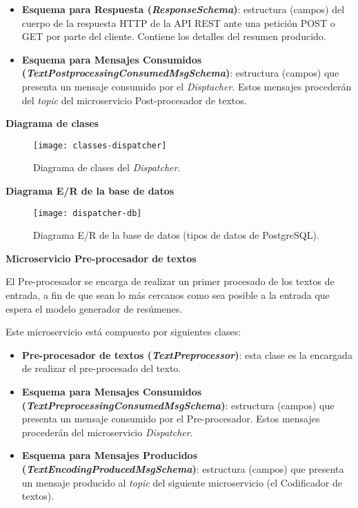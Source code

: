 \begin{itemize} [\textbullet]
	\item \textbf{Esquema para Respuesta (\emph{ResponseSchema})}: estructura (campos) del cuerpo de la respuesta HTTP de la API REST ante una petición POST o GET por parte del cliente. Contiene los detalles del resumen producido.
	
	\item \textbf{Esquema para Mensajes Consumidos \\ (\emph{TextPostprocessingConsumedMsgSchema})}: estructura (campos) que presenta un mensaje consumido por el \emph{Disptacher}. Estos mensajes procederán del \emph{topic} del microservicio Post-procesador de textos.
\end{itemize}

\noindent
\textbf{Diagrama de clases}

\begin{figure}[h]
	\centering
	\texttt{[image: classes-dispatcher]}
	\vspace{-0.5cm}
	\caption{Diagrama de clases del \emph{Dispatcher}.}
\end{figure}

\newpage

\noindent
\textbf{Diagrama E/R de la base de datos}

\begin{figure}[h!]
	\centering
	\texttt{[image: dispatcher-db]}
	\vspace{-0.5cm}
	\caption{Diagrama E/R de la base de datos (tipos de datos de PostgreSQL).}
\end{figure}


\noindent
\textbf{\large Microservicio Pre-procesador de textos}

El Pre-procesador se encarga de realizar un primer procesado de los textos de entrada, a fin de que sean lo más cercanos como sea posible a la entrada que espera el modelo generador de resúmenes.

Este microservicio está compuesto por siguientes clases:

\vspace{-0.2cm}
\begin{itemize} [\textbullet]
	\item \textbf{Pre-procesador de textos (\emph{TextPreprocessor})}: esta clase es la encargada de realizar el pre-procesado del texto.
	
	\item \textbf{Esquema para Mensajes Consumidos \\ (\emph{TextPreprocessingConsumedMsgSchema})}: estructura (campos) que presenta un mensaje consumido por el Pre-procesador. Estos mensajes procederán del microservicio \emph{Dispatcher}.
	
	\item \textbf{Esquema para Mensajes Producidos \\ (\emph{TextEncodingProducedMsgSchema})}: estructura (campos) que presenta un mensaje producido al \emph{topic} del siguiente microservicio (el Codificador de textos).
\end{itemize}

